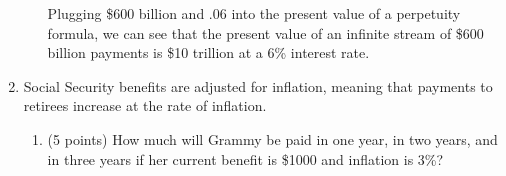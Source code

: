 \documentclass[twoside]{article}
\begin{document}
\begin{enumerate}
\begin{enumerate}
\begin{KEY}
Plugging \$600 billion and $.06$ into the present value of a perpetuity formula, we can see that the present value of an infinite stream of \$600 billion payments is \$10 trillion at a 6\% interest rate.
\end{KEY}

\begin{comment}
    \item \begin{EXAM} (5 points) There are many different Social Security reform proposals, including one that President Bush is working on. Assume (accurately enough) that all these reform proposals leave benefits unchanged for workers currently over 55. How (if at all) do the benefits promised these workers affect the merits of the various reform proposals? \vspace{2in} \end{EXAM}

\begin{KEY}
These are sunk costs (or, if you prefer, sunk benefits), so they cannot be the sole reason for choosing one reform proposal over another. However, they can still affect the merits of the various reform proposals. For example, if paying off the benefits promised to workers currently over 55 will increase the government debt level, the impact that will have on the financial health of the U.S.\ government may increase or decrease the attractiveness of various reform proposals. (See problem 2 in Chapter 1 for a similar situation.)
\end{KEY}
\end{comment}

    \end{enumerate}




\item \begin{EXAM} Social Security benefits are adjusted for inflation, meaning that payments to retirees increase at the rate of inflation. \end{EXAM}

    \begin{enumerate}

    \item \begin{EXAM} (5 points) How much will Grammy be paid in one year, in two years, and in three years if her current benefit is \$1000 and inflation is 3\%? \vspace{1.5in} \end{EXAM}


\end{enumerate}
\end{enumerate}
\end{document}
